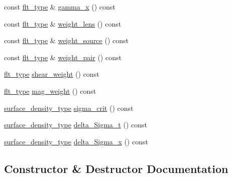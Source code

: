 \begin{DoxyCompactItemize}
\item 
const \hyperlink{lib_2IceBRG__main_2common_8h_ad0f130a56eeb944d9ef2692ee881ecc4}{flt\+\_\+type} \& \hyperlink{classIceBRG_1_1lens__source__pair_af59a57794b44b61a067a738cd509c6a8}{gamma\+\_\+x} () const 
\item 
const \hyperlink{lib_2IceBRG__main_2common_8h_ad0f130a56eeb944d9ef2692ee881ecc4}{flt\+\_\+type} \& \hyperlink{classIceBRG_1_1lens__source__pair_a10e331a9f505c85cdae973536492eb25}{weight\+\_\+lens} () const 
\item 
const \hyperlink{lib_2IceBRG__main_2common_8h_ad0f130a56eeb944d9ef2692ee881ecc4}{flt\+\_\+type} \& \hyperlink{classIceBRG_1_1lens__source__pair_aa4167fccfaa01c0eaeb878d8549cc4bc}{weight\+\_\+source} () const 
\item 
const \hyperlink{lib_2IceBRG__main_2common_8h_ad0f130a56eeb944d9ef2692ee881ecc4}{flt\+\_\+type} \& \hyperlink{classIceBRG_1_1lens__source__pair_a0772a7b53e2c472d44dc037aa539f41e}{weight\+\_\+pair} () const 
\item 
\hyperlink{lib_2IceBRG__main_2common_8h_ad0f130a56eeb944d9ef2692ee881ecc4}{flt\+\_\+type} \hyperlink{classIceBRG_1_1lens__source__pair_afa440c72c88f251192c0482ab44822e8}{shear\+\_\+weight} () const 
\item 
\hyperlink{lib_2IceBRG__main_2common_8h_ad0f130a56eeb944d9ef2692ee881ecc4}{flt\+\_\+type} \hyperlink{classIceBRG_1_1lens__source__pair_a680f4fe6cc932d227f2b24b6f031775a}{mag\+\_\+weight} () const 
\item 
\hyperlink{namespaceIceBRG_a80c597ef5ba0a32491d32a9f0083b02d}{surface\+\_\+density\+\_\+type} \hyperlink{classIceBRG_1_1lens__source__pair_a6af844a480b060353c6b88d2cb2a294c}{sigma\+\_\+crit} () const 
\item 
\hyperlink{namespaceIceBRG_a80c597ef5ba0a32491d32a9f0083b02d}{surface\+\_\+density\+\_\+type} \hyperlink{classIceBRG_1_1lens__source__pair_a47e8ee643906f15d6652c1f0ae9edbd8}{delta\+\_\+\+Sigma\+\_\+t} () const 
\item 
\hyperlink{namespaceIceBRG_a80c597ef5ba0a32491d32a9f0083b02d}{surface\+\_\+density\+\_\+type} \hyperlink{classIceBRG_1_1lens__source__pair_a673110752d77f2bb9f1868057b041dc7}{delta\+\_\+\+Sigma\+\_\+x} () const 
\end{DoxyCompactItemize}


\subsection{Constructor \& Destructor Documentation}
\hypertarget{classIceBRG_1_1lens__source__pair_ac645e063e02854ed96f79b53cccbb05e}{}
